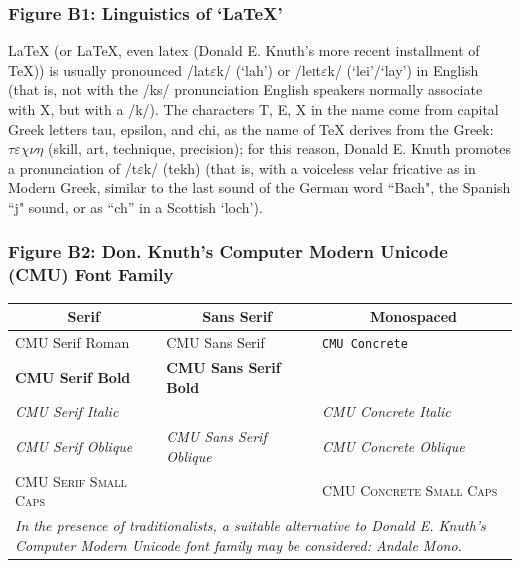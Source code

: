 \documentclass[11pt, english]{article}
\begin{document}
		\subsubsection*{Figure B1: Linguistics of `{\LaTeX}'}

		{\LaTeX} (or LaTeX, even latex (Donald E. Knuth's more recent installment of {\TeX})) is usually pronounced /la\textlengthmark t$\varepsilon$k/ (`lah') or /le\textsc{i}t$\varepsilon$k/ (`lei'/`lay') in English (that is, not with the /ks/ pronunciation English speakers normally associate with X, but with a /k/). The characters T, E, X in the name come from capital Greek letters tau, epsilon, and chi, as the name of {\TeX} derives from the Greek: $\tau\varepsilon\chi\nu\eta$ (skill, art, technique, precision); for this reason, Donald E. Knuth promotes a pronunciation of /t$\varepsilon$k/ (tekh) (that is, with a voiceless velar fricative as in Modern Greek, similar to the last sound of the German word ``Bach", the Spanish ``j" sound, or as ``ch'' in a Scottish `loch'). 

		\subsubsection*{Figure B2: Don. Knuth's Computer Modern Unicode (CMU) Font Family}

		\begin{table}[h]
			\scriptsize
			\renewcommand{\arraystretch}{1.25}
		\begin{center}
		\begin{tabular}{p{4cm}p{4cm}p{4cm}}
			\hline
			\multicolumn{1}{c}{\textbf{Serif}} & \multicolumn{1}{c}{\textbf{Sans Serif}} & \multicolumn{1}{c}{\textbf{Monospaced}}\\
			\hline
			CMU Serif Roman & \textsf{CMU Sans Serif} & \texttt{CMU Concrete}\\
			\textbf{CMU Serif Bold} & \sffamily \textbf{CMU Sans Serif Bold} & \\ 
				\textit{CMU Serif Italic} & & \ttfamily \textit{CMU Concrete Italic}\\
			\textsl{CMU Serif Oblique} & \sffamily \textsl{CMU Sans Serif Oblique} & \ttfamily \textsl{CMU Concrete Oblique}\\
				\textsc{CMU Serif Small Caps} & & \ttfamily \textsc{CMU Concrete Small Caps}\\
			\hline
				\multicolumn{3}{p{13cm}}{\textit{In the presence of traditionalists, a suitable alternative to Donald E. Knuth's Computer Modern Unicode font family may be considered: Andale Mono.}}\\
			\hline
		\end{tabular}
		\end{center}
		\end{table}
\end{document}
